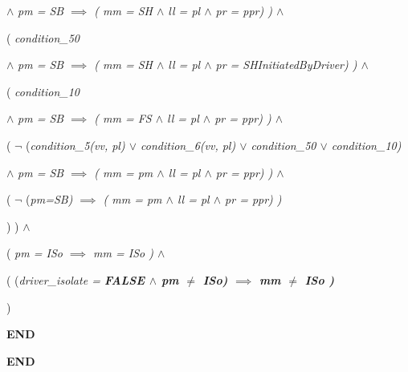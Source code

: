 \documentclass[11pt]{article}
\begin{document}
\begin{sloppypar}
\hspace*{1.00in} $\land$  \it pm \rm = \it SB  $\implies$  \rm ( \it mm \rm = \it SH  $\land$  \it ll \rm = \it pl  $\land$  \it pr \rm = \it ppr\rm ) \rm )  $\land$ 

\hspace*{0.80in}\rm ( \it condition\_50 

\hspace*{1.00in} $\land$  \it pm \rm = \it SB  $\implies$  \rm ( \it mm \rm = \it SH\hspace*{0.10in} $\land$  \it ll \rm = \it pl  $\land$  \it pr \rm = \it SHInitiatedByDriver\rm ) \rm )  $\land$ 

\hspace*{0.80in}\hspace*{0.80in}\rm ( \it condition\_10 

\hspace*{1.00in} $\land$  \it pm \rm = \it SB  $\implies$  \rm ( \it mm \rm = \it FS  $\land$  \it ll \rm = \it pl  $\land$  \it pr \rm = \it ppr\rm ) \rm )  $\land$ 

\hspace*{0.80in}\hspace*{0.80in}\rm (  $\neg$ \rm (\it condition\_5\rm (\it vv\rm , \it pl\rm )  $\lor$  \it condition\_6\rm (\it vv\rm , \it pl\rm )  $\lor$  \it condition\_50  $\lor$  \it condition\_10\rm ) 

\hspace*{1.00in} $\land$  \it pm \rm = \it SB  $\implies$  \rm ( \it mm \rm = \it pm  $\land$  \it ll \rm = \it pl  $\land$  \it pr \rm = \it ppr\rm ) \rm )  $\land$ 

\hspace*{0.80in}\hspace*{0.80in}\rm ( $\neg$ \rm (\it pm\rm =\it SB\rm )  $\implies$  \rm ( \it mm \rm = \it pm  $\land$  \it ll \rm = \it pl  $\land$  \it pr \rm = \it ppr\rm ) \rm )

\hspace*{0.80in}\rm ) \rm )  $\land$ 

\hspace*{0.60in}\rm ( \it pm \rm = \it ISo  $\implies$  \it mm \rm = \it ISo \rm )\hspace*{0.25in} $\land$ 

\hspace*{0.60in}\hspace*{0.60in}\hspace*{0.60in}\rm ( \rm (\it driver\_isolate \rm = \bf FALSE  $\land$  \it pm  $\not =$  \it ISo\rm )  $\implies$ \hspace*{0.10in}\it mm  $\not =$  \it ISo \rm )\hspace*{0.40in}

\hspace*{0.60in}\rm )

\hspace*{0.20in}\bf END

\hspace*{0.40in}

\vspace*{4mm}
\bf END

\newpage
\end{sloppypar}
\end{document}
